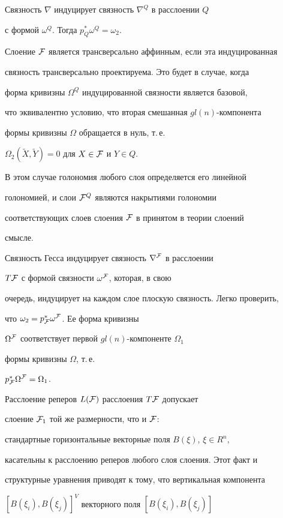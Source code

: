 Связность $\nabla$ индуцирует связность $\nabla^{Q}$ в расслоении $Q$


с формой $\omega^Q$. Тогда ${p}_Q^{\ast}\omega^Q = \omega_2$.


Слоение $\cal F$ является трансверсально аффинным, если эта индуцированная


связность трансверсально проектируема. Это будет в случае, когда


форма кривизны $\Omega^Q$ индуцированной связности является базовой,


что эквивалентно условию, что вторая смешанная $gl(n)$-компонента


формы кривизны $\Omega$ обращается в нуль, т.\,е.


$\Omega_2(\widetilde{X}, \widetilde{Y}) = 0$ для $X\in {\cal F}$ и $Y \in Q$.


В этом случае голономия любого слоя определяется его линейной


голономией, и слои ${\cal F}^Q$ являются накрытиями голономии


соответствующих слоев слоения $\cal F$ в принятом в теории слоений


смысле.





Связность Гесса индуцирует связность $\nabla^{\cal F}$ в расслоении


$T{\cal F}$ с формой связности $\omega^{\cal F}$, которая, в свою


очередь, индуцирует на каждом слое плоскую связность. Легко проверить,


что $\omega_2 = p_{\cal F}^{\ast}\omega^{\cal F}$. Ее форма кривизны


$\Omega^{\cal F}$ соответствует первой $gl(n)$-компоненте $\Omega_1$


формы кривизны $\Omega$, т.\,е.


$p_{\cal F}^{\ast}\Omega^{\cal F} = \Omega_1$.


Расслоение реперов $L(\cal F)$ расслоения $T{\cal F}$ допускает


слоение ${\cal F}_1$ той же размерности, что и $\cal F$:


стандартные горизонтальные векторные поля $B(\xi)$, $\xi \in R^n,$


касательны к расслоению реперов любого слоя слоения. Этот факт и


структурные уравнения приводят к тому, что вертикальная компонента


$[B(\xi_i), B(\xi_j)]^V$ векторного поля $[B(\xi_i), B(\xi_j)]$


